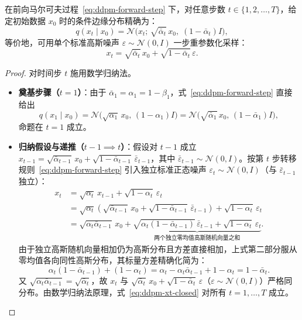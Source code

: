 \begin{thmBox}
\begin{theorem}
\label{thm:ddpm-forward}
在前向马尔可夫过程~\eqref{eq:ddpm-forward-step} 下，对任意步数 $t \in \{1, 2, \dots, T\}$，给定初始数据 $x_0$ 时的条件边缘分布精确为：
\begin{equation}
  q(x_t \mid x_0) = \mathcal{N}\!\big(x_t;\, \sqrt{\bar{\alpha}_t}\, x_0,\; (1 - \bar{\alpha}_t) I\big),
  \label{eq:ddpm-xt-closed}
\end{equation}
等价地，可用单个标准高斯噪声 $\varepsilon \sim \mathcal{N}(0, I)$ 一步重参数化采样：
\begin{equation}
  x_t = \sqrt{\bar{\alpha}_t}\, x_0 + \sqrt{1 - \bar{\alpha}_t}\,\varepsilon.
  \label{eq:ddpm-xt-reparam}
\end{equation}
\end{theorem}
\begin{proof}
对时间步 $t$ 施用数学归纳法。
\begin{itemize}
  \item \textbf{奠基步骤（$t = 1$）}：由于 $\bar{\alpha}_1 = \alpha_1 = 1 - \beta_1$，式~\eqref{eq:ddpm-forward-step} 直接给出
  \[
    q(x_1 \mid x_0) = \mathcal{N}\!\big(\sqrt{\alpha_1}\, x_0,\, (1 - \alpha_1) I\big)
    = \mathcal{N}\!\big(\sqrt{\bar{\alpha}_1}\, x_0,\, (1 - \bar{\alpha}_1) I\big),
  \]
  命题在 $t = 1$ 成立。
  \item \textbf{归纳假设与递推（$t-1 \implies t$）}：假设对 $t - 1$ 成立 $x_{t-1} = \sqrt{\bar{\alpha}_{t-1}}\, x_0 + \sqrt{1 - \bar{\alpha}_{t-1}}\, \bar{\varepsilon}_{t-1}$，其中 $\bar{\varepsilon}_{t-1} \sim \mathcal{N}(0, I)$。按第 $t$ 步转移规则~\eqref{eq:ddpm-forward-step} 引入独立标准正态噪声 $\varepsilon_t \sim \mathcal{N}(0, I)$（与 $\bar{\varepsilon}_{t-1}$ 独立）：
  \begin{align*}
    x_t &= \sqrt{\alpha_t}\, x_{t-1} + \sqrt{1 - \alpha_t}\,\varepsilon_t \\
        &= \sqrt{\alpha_t}\!\left(\sqrt{\bar{\alpha}_{t-1}}\, x_0 + \sqrt{1 - \bar{\alpha}_{t-1}}\,\bar{\varepsilon}_{t-1}\right) + \sqrt{1 - \alpha_t}\,\varepsilon_t \\
        &= \sqrt{\alpha_t \bar{\alpha}_{t-1}}\, x_0
           + \underbrace{\sqrt{\alpha_t(1 - \bar{\alpha}_{t-1})}\,\bar{\varepsilon}_{t-1} + \sqrt{1 - \alpha_t}\,\varepsilon_t}_{\text{两个独立零均值高斯随机向量之和}}.
  \end{align*}
  由于独立高斯随机向量相加仍为高斯分布且方差直接相加，上式第二部分服从零均值各向同性高斯分布，其标量方差精确化简为：
  \[
    \alpha_t(1 - \bar{\alpha}_{t-1}) + (1 - \alpha_t)
    = \alpha_t - \alpha_t\bar{\alpha}_{t-1} + 1 - \alpha_t
    = 1 - \bar{\alpha}_t.
  \]
  又 $\sqrt{\alpha_t \bar{\alpha}_{t-1}} = \sqrt{\bar{\alpha}_t}$，故 $x_t$ 与 $\sqrt{\bar{\alpha}_t}\,x_0 + \sqrt{1 - \bar{\alpha}_t}\,\varepsilon$（$\varepsilon \sim \mathcal{N}(0, I)$）严格同分布。由数学归纳法原理，式~\eqref{eq:ddpm-xt-closed} 对所有 $t = 1, \dots, T$ 成立。
\end{itemize}
\end{proof}
\end{thmBox}

